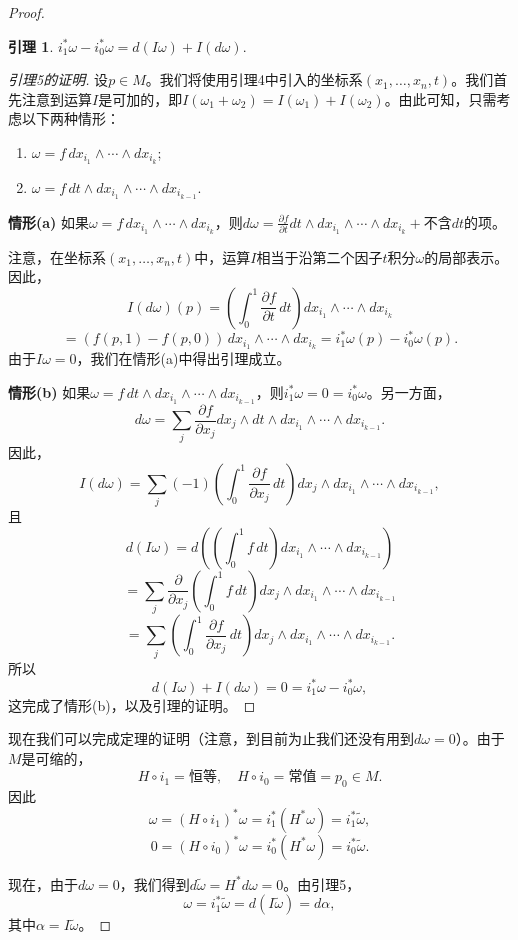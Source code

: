 \documentclass[12pt,a4paper]{ctexbook}
\newtheorem{lemma}[theorem]{引理}
\begin{document}
\begin{proof}
\begin{lemma}
$i_1^*\omega - i_0^*\omega = d(I\omega) + I(d\omega).$
\end{lemma}

\begin{proof}[引理5的证明]
设$p\in M$。我们将使用引理4中引入的坐标系$(x_1,\ldots,x_n,t)$。我们首先注意到运算$I$是可加的，即$I(\omega_1+\omega_2) = I(\omega_1) + I(\omega_2)$。由此可知，只需考虑以下两种情形：
\begin{enumerate}[label=\alph*)]
    \item $\omega = f\,dx_{i_1}\wedge\cdots\wedge dx_{i_k}$;
    \item $\omega = f\,dt\wedge dx_{i_1}\wedge\cdots\wedge dx_{i_{k-1}}$.
\end{enumerate}

\textbf{情形(a)} 如果$\omega = f\,dx_{i_1}\wedge\cdots\wedge dx_{i_k}$，则$d\omega = \frac{\partial f}{\partial t}dt\wedge dx_{i_1}\wedge\cdots\wedge dx_{i_k} + \text{不含}dt\text{的项}$。

注意，在坐标系$(x_1,\ldots,x_n,t)$中，运算$I$相当于沿第二个因子$t$积分$\omega$的局部表示。因此，
$$I(d\omega)(p) = \left(\int_0^1 \frac{\partial f}{\partial t}\,dt\right) dx_{i_1}\wedge\cdots\wedge dx_{i_k}$$
$$= (f(p,1) - f(p,0))\,dx_{i_1}\wedge\cdots\wedge dx_{i_k} = i_1^*\omega(p) - i_0^*\omega(p).$$
由于$I\omega = 0$，我们在情形(a)中得出引理成立。

\textbf{情形(b)} 如果$\omega = f\,dt\wedge dx_{i_1}\wedge\cdots\wedge dx_{i_{k-1}}$，则$i_1^*\omega = 0 = i_0^*\omega$。另一方面，
$$d\omega = \sum_j \frac{\partial f}{\partial x_j} dx_j\wedge dt\wedge dx_{i_1}\wedge\cdots\wedge dx_{i_{k-1}}.$$
因此，
$$I(d\omega) = \sum_j (-1) \left(\int_0^1 \frac{\partial f}{\partial x_j}\,dt\right) dx_j\wedge dx_{i_1}\wedge\cdots\wedge dx_{i_{k-1}},$$
且
$$d(I\omega) = d\left(\left(\int_0^1 f\,dt\right) dx_{i_1}\wedge\cdots\wedge dx_{i_{k-1}}\right)$$
$$= \sum_j \frac{\partial}{\partial x_j}\left(\int_0^1 f\,dt\right) dx_j\wedge dx_{i_1}\wedge\cdots\wedge dx_{i_{k-1}}$$
$$= \sum_j \left(\int_0^1 \frac{\partial f}{\partial x_j}\,dt\right) dx_j\wedge dx_{i_1}\wedge\cdots\wedge dx_{i_{k-1}}.$$
所以
$$d(I\omega) + I(d\omega) = 0 = i_1^*\omega - i_0^*\omega,$$
这完成了情形(b)，以及引理的证明。
\end{proof}

现在我们可以完成定理的证明（注意，到目前为止我们还没有用到$d\omega=0$）。由于$M$是可缩的，
$$H\circ i_1 = \text{恒等},\quad H\circ i_0 = \text{常值} = p_0\in M.$$
因此
$$\omega = (H\circ i_1)^*\omega = i_1^*(H^*\omega) = i_1^*\tilde{\omega},$$
$$0 = (H\circ i_0)^*\omega = i_0^*(H^*\omega) = i_0^*\tilde{\omega}.$$

现在，由于$d\omega=0$，我们得到$d\tilde{\omega} = H^*d\omega = 0$。由引理5，
$$\omega = i_1^*\tilde{\omega} = d(I\tilde{\omega}) = d\alpha,$$
其中$\alpha = I\tilde{\omega}$。
\end{proof}
\end{document}
